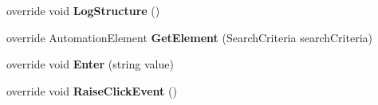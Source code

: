 \begin{DoxyCompactItemize}
\item 
\hypertarget{class_proto_test_1_1_golem_1_1_white_1_1_elements_1_1_white_text_box_a61c4aa9697e9ed5022b4894b8355fe03}{override void {\bfseries Log\-Structure} ()}\label{class_proto_test_1_1_golem_1_1_white_1_1_elements_1_1_white_text_box_a61c4aa9697e9ed5022b4894b8355fe03}

\item 
\hypertarget{class_proto_test_1_1_golem_1_1_white_1_1_elements_1_1_white_text_box_ad08dda0721505b1cdbe84340d18fbc20}{override Automation\-Element {\bfseries Get\-Element} (Search\-Criteria search\-Criteria)}\label{class_proto_test_1_1_golem_1_1_white_1_1_elements_1_1_white_text_box_ad08dda0721505b1cdbe84340d18fbc20}

\item 
\hypertarget{class_proto_test_1_1_golem_1_1_white_1_1_elements_1_1_white_text_box_af8f5a95714a00496ea1fb5e7f6fc7c89}{override void {\bfseries Enter} (string value)}\label{class_proto_test_1_1_golem_1_1_white_1_1_elements_1_1_white_text_box_af8f5a95714a00496ea1fb5e7f6fc7c89}

\item 
\hypertarget{class_proto_test_1_1_golem_1_1_white_1_1_elements_1_1_white_text_box_ad7c91bb4159ef74d5a31f2a3ffd0073a}{override void {\bfseries Raise\-Click\-Event} ()}\label{class_proto_test_1_1_golem_1_1_white_1_1_elements_1_1_white_text_box_ad7c91bb4159ef74d5a31f2a3ffd0073a}

\end{DoxyCompactItemize}
